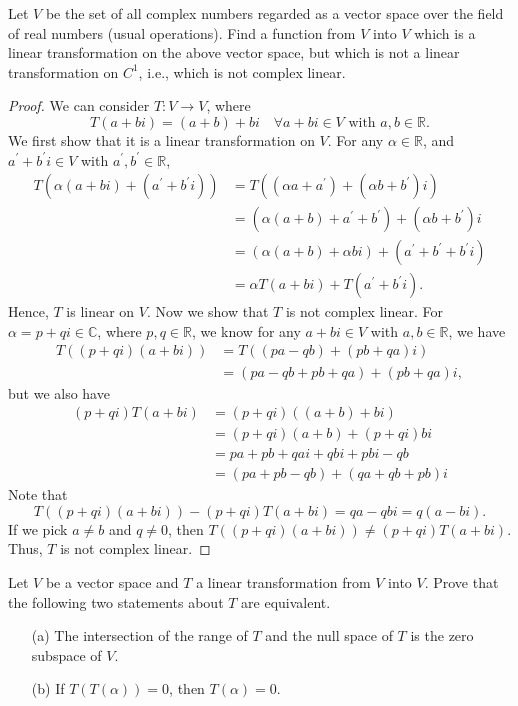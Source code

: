 \begin{problem}
    Let \(V\) be the set of all complex numbers regarded as a vector space over the field of real numbers (usual operations). Find a function from \(V\) into \(V\) which is a linear transformation on the above vector space, but which is not a linear transformation on \(C^1\), i.e., which is not complex linear.
\end{problem}
\begin{proof}
    We can consider \(T:V \to V\), where
    \[
        T(a+ bi) = (a + b) + bi \quad \forall a+bi \in V \text{ with }a,b \in \mathbb{R}.
    \] 
    We first show that it is a linear transformation on \(V\). For any \(\alpha \in \mathbb{R} \), and \(a^{\prime} + b^{\prime} i \in V\) with \(a^{\prime} ,b^{\prime} \in \mathbb{R}\),
    \begin{align*}
        T(\alpha (a + bi) + (a^{\prime} + b^{\prime} i)) &= T((\alpha a + a^{\prime} ) + (\alpha b + b^{\prime} )i) \\
        &= (\alpha (a + b) + a^{\prime} + b^{\prime} ) + (\alpha b + b^{\prime} )i \\
        &= (\alpha (a+b) + \alpha b i) + (a^{\prime} +b^{\prime}  + b^{\prime} i) \\
        &= \alpha T(a + bi) + T(a^{\prime} +b^{\prime} i).
    \end{align*}
    Hence, \(T\) is linear on \(V\). Now we show that \(T\) is not complex linear. 
    For \(\alpha = p + qi \in \mathbb{C} \), where \(p, q \in \mathbb{R} \), we know 
    for any \(a + bi \in V\) with \(a, b \in \mathbb{R} \), we have 
    \begin{align*}
        T((p+qi)(a+bi)) &= T((pa-qb) + (pb+qa)i) \\
        &= (pa-qb+pb+qa)+(pb+qa)i,
    \end{align*}    
    but we also have 
    \begin{align*}
        (p + qi)T(a + bi) &= (p + qi)((a+b) + bi) \\
        &= (p + qi)(a + b) + (p + qi)bi \\
        &= pa + pb + qai + qbi + pbi - qb \\
        &= (pa + pb - qb) + (qa + qb + pb)i
    \end{align*}
    Note that
    \[
        T((p+qi)(a+bi)) - (p+qi)T(a+bi) = qa-qbi=q(a-bi).
    \]
    If we pick \(a \neq b\) and \(q \neq 0\), then \(T((p+qi)(a+bi)) \neq (p+qi)T(a+bi)\). Thus, \(T\) is not complex linear. 
\end{proof}
\begin{problem}
    Let \(V\) be a vector space and \(T\) a linear transformation from \(V\) into \(V\). Prove that the following two statements about \(T\) are equivalent.
    \begin{itemize}
        \item [(a)]The intersection of the range of \(T\) and the null space of \(T\) is the zero subspace of \(V\).
        \item [(b)]If \(T(T(\alpha )) = 0\), then \(T(\alpha )=0\).  
    \end{itemize}
\end{problem}
